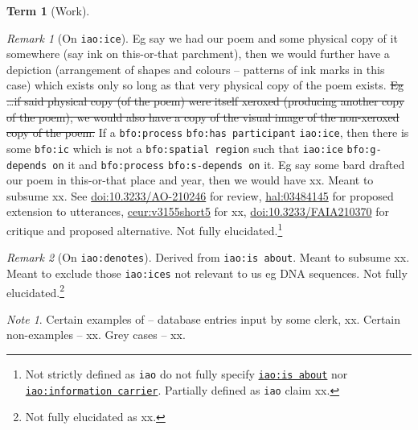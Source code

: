 \documentclass{amsart}%
\newcommand{\code}[1]{\texttt{#1}}%
\theoremstyle{plain}
\theoremstyle{definition}
\theoremstyle{remark}
\newtheorem*{note}{Note}
\theoremstyle{definition}
\newtheorem{term}{Term}[subsection]%
\theoremstyle{remark}
\newtheorem*{term-note}{Remark}
\begin{document}
\begin{term}[Work]
\begin{term-note}[On \code{iao:ice}]
{%
Eg say we had our poem and some physical copy of it somewhere (say ink on this-or-that parchment), then we would further have a depiction (arrangement of shapes and colours -- patterns of ink marks in this case) which exists only so long as that very physical copy of the poem exists. \sout{Eg \ldots if said physical copy (of the poem) were itself xeroxed (producing another copy of the poem), we would also have a copy of the visual image of the non-xeroxed copy of the poem.} %
%
%
If a \code{bfo:process} \code{bfo:has participant} \code{iao:ice}, then there is some \code{bfo:ic} which is not a \code{bfo:spatial region} such that \code{iao:ice} \code{bfo:g-depends on} it and \code{bfo:process} \code{bfo:s-depends on} it. Eg say some bard drafted our poem in this-or-that place and year, then we would have xx.} Meant to subsume xx. See \href{https://doi.org/10.3233/AO-210246}{doi:10.3233/AO-210246} for review, \href{https://hal.science/hal-03484145}{hal:03484145} for proposed extension to utterances, \href{https://ceur-ws.org/Vol-3155/short5.pdf}{ceur:v3155short5} for xx, \href{https://doi.org/10.3233/FAIA210370}{doi:10.3233/FAIA210370} for critique and proposed alternative. Not fully elucidated.\footnote{Not strictly defined as \code{iao} do not fully specify \href{http://purl.obolibrary.org/obo/IAO_0000136}{\code{iao:is about}} nor \href{http://purl.obolibrary.org/obo/IAO_0000015}{\code{iao:information carrier}}. %
%
%
Partially defined as \code{iao} claim xx.}
\end{term-note}
\begin{term-note}[On \code{iao:denotes}]
Derived from \code{iao:is about}. Meant to subsume xx. Meant to exclude those \code{iao:ices} not relevant to us eg DNA sequences. Not fully elucidated.\footnote{Not fully elucidated as xx.}
\end{term-note}
\begin{note}
Certain examples of -- database entries input by some clerk, xx. Certain non-examples -- xx. Grey cases -- xx.%
\end{note}
\end{term}
%
\end{document}
